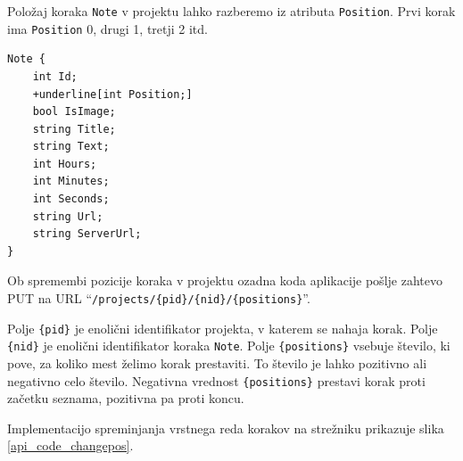 \documentclass[a4paper, 12pt]{book}
\begin{document}
Položaj koraka \texttt{Note} v projektu lahko razberemo iz atributa \texttt{Position}.
Prvi korak ima \texttt{Position} 0, drugi 1, tretji 2 itd.


\begin{Verbatim}[commandchars=+\[\]]
Note { 
    int Id; 
    +underline[int Position;]
    bool IsImage;  
    string Title; 
    string Text;
    int Hours; 
    int Minutes;
    int Seconds;
    string Url;
    string ServerUrl;
}
\end{Verbatim}


Ob spremembi pozicije koraka v projektu ozadna koda aplikacije pošlje zahtevo PUT na URL \enquote{\texttt{/projects/\{pid\}/\{nid\}/\{positions\}}}.

Polje \texttt{\{pid\}} je enolični identifikator projekta, v katerem se nahaja korak.
Polje \texttt{\{nid\}} je enolični identifikator koraka \texttt{Note}.
Polje \texttt{\{positions\}} vsebuje število, ki pove, za koliko mest želimo korak prestaviti.
To število je lahko pozitivno ali negativno celo število.
Negativna vrednost \texttt{\{positions\}} prestavi korak proti začetku seznama, pozitivna pa proti koncu.

Implementacijo spreminjanja vrstnega reda korakov na strežniku prikazuje slika \ref{api_code_changepos}.

\clearpage
\end{document}
